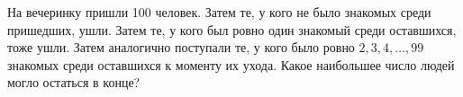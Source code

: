 \documentclass{article}
\begin{document}
\begin{enumerate_boxed}
        \item На вечеринку пришли 100 человек.
        Затем те, у кого не было знакомых среди пришедших, ушли.
        Затем те, у кого был ровно один знакомый среди оставшихся, тоже ушли.
        Затем аналогично поступали те, у кого было ровно $2, 3, 4, \dots, 99$ знакомых среди оставшихся к моменту их ухода.
        Какое наибольшее число людей могло остаться в конце?

    \end{enumerate_boxed}
\end{document}
